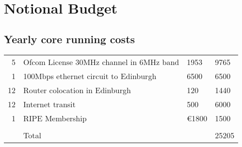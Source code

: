 \section{Notional Budget}

\subsection{Yearly core running costs}

\begin{tabular}{rp{}p{}p{}}
  5 & Ofcom License 30MHz channel in 6MHz band & 1953 & 9765 \\
  1 & 100Mbps ethernet circuit to Edinburgh & 6500 & 6500\\
  12 & Router colocation in Edinburgh & 120 & 1440\\
  12 & Internet transit & 500 & 6000\\
  1 & RIPE Membership & \euro 1800 & 1500\\
  \hline\\
  & Total & & 25205\\
\end{tabular}
